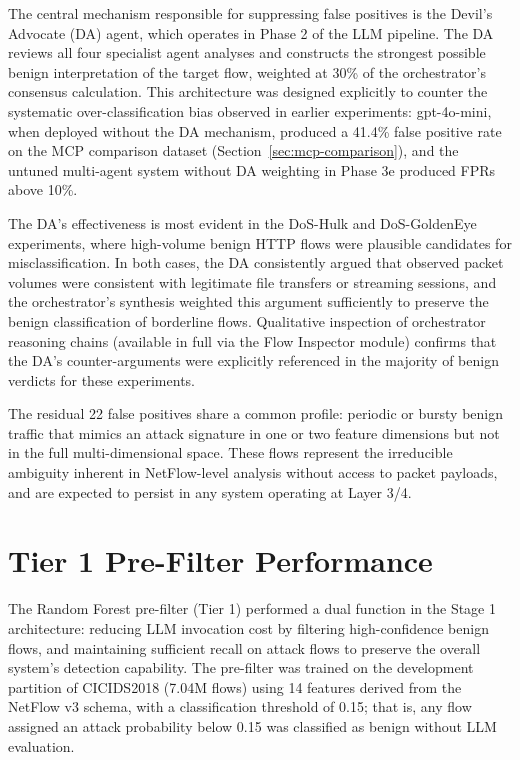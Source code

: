 \documentclass[../main.tex]{subfiles}
\begin{document}
The central mechanism responsible for suppressing false positives is the Devil's Advocate (DA) agent, which operates in Phase 2 of the LLM pipeline. The DA reviews all four specialist agent analyses and constructs the strongest possible benign interpretation of the target flow, weighted at 30\% of the orchestrator's consensus calculation. This architecture was designed explicitly to counter the systematic over-classification bias observed in earlier experiments: gpt-4o-mini, when deployed without the DA mechanism, produced a 41.4\% false positive rate on the MCP comparison dataset (Section~\ref{sec:mcp-comparison}), and the untuned multi-agent system without DA weighting in Phase 3e produced FPRs above 10\%.

The DA's effectiveness is most evident in the DoS-Hulk and DoS-GoldenEye experiments, where high-volume benign HTTP flows were plausible candidates for misclassification. In both cases, the DA consistently argued that observed packet volumes were consistent with legitimate file transfers or streaming sessions, and the orchestrator's synthesis weighted this argument sufficiently to preserve the benign classification of borderline flows. Qualitative inspection of orchestrator reasoning chains (available in full via the Flow Inspector module) confirms that the DA's counter-arguments were explicitly referenced in the majority of benign verdicts for these experiments.

The residual 22 false positives share a common profile: periodic or bursty benign traffic that mimics an attack signature in one or two feature dimensions but not in the full multi-dimensional space. These flows represent the irreducible ambiguity inherent in NetFlow-level analysis without access to packet payloads, and are expected to persist in any system operating at Layer 3/4.

\section{Tier 1 Pre-Filter Performance}
\label{sec:tier1-performance}

The Random Forest pre-filter (Tier 1) performed a dual function in the Stage 1 architecture: reducing LLM invocation cost by filtering high-confidence benign flows, and maintaining sufficient recall on attack flows to preserve the overall system's detection capability. The pre-filter was trained on the development partition of CICIDS2018 (7.04M flows) using 14 features derived from the NetFlow v3 schema, with a classification threshold of 0.15; that is, any flow assigned an attack probability below 0.15 was classified as benign without LLM evaluation.
\end{document}
